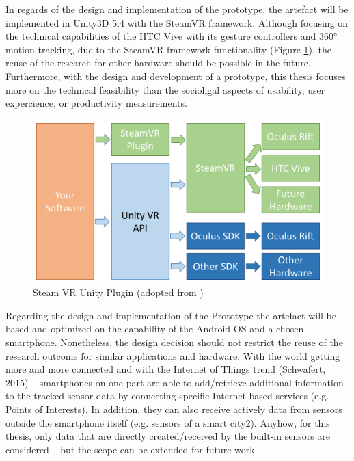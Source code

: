 In regards of the design and implementation of the prototype, the artefact will be implemented in Unity3D 5.4 with the SteamVR framework. Although focusing on the technical capabilities of the HTC Vive with its gesture controllers and 360° motion tracking, due to the SteamVR framework functionality (Figure \ref{fig:steamvr}), the reuse of the research for other hardware should be possible in the future. \newline
Furthermore, with the design and development of a prototype, this thesis focuses more on the technical feasibility than the socioligal aspects of usability, user expercience, or productivity measurements. 
\begin{figure}[h]
	\begin{center}
		\includegraphics[width=14cm]{03_Figures/04_Valve/OpenVR_SteamVR.png}
		\caption[Steam VR Unity Plugin]{Steam VR Unity Plugin (adopted from \cite{Valve2016})}
		\label{fig:steamvr}
	\end{center}
\end{figure}



Regarding the design and implementation of the Prototype the artefact will be based and optimized on the capability of the Android OS and a chosen smartphone. Nonetheless, the design decision should not restrict the reuse of the research outcome for similar applications and hardware.
With the world getting more and more connected and with the Internet of Things trend (Schwafert, 2015) – smartphones on one part are able to add/retrieve additional information to the tracked sensor data by connecting specific Internet based services (e.g. Points of Interests). In addition, they can also receive actively data from sensors outside the smartphone itself (e.g. sensors of a smart city2). Anyhow, for this thesis, only data that are directly created/received by the built-in sensors are considered – but the scope can be extended for future work.


